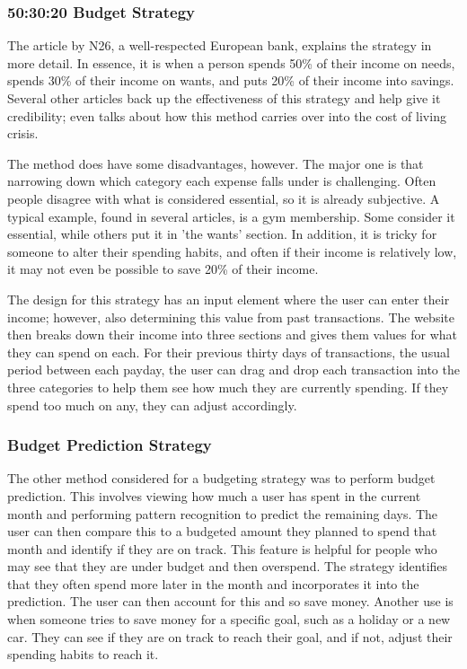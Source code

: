 \subsubsection{50:30:20 Budget Strategy}

The article \cite{503020Strategy} by N26, a well-respected European bank, explains the strategy in more detail. In essence, it is when a person spends 50\% of their income on needs, spends 30\% of their income on wants, and puts 20\% of their income into savings. Several other articles back up the effectiveness of this strategy and help give it credibility; \cite{503020InCostLivingCrisis} even talks about how this method carries over into the cost of living crisis. 

The method does have some disadvantages, however. The major one is that narrowing down which category each expense falls under is challenging. Often people disagree with what is considered essential, so it is already subjective. A typical example, found in several articles, is a gym membership. Some consider it essential, while others put it in 'the wants' section. In addition, it is tricky for someone to alter their spending habits, and often if their income is relatively low, it may not even be possible to save 20\% of their income.

The design for this strategy has an input element where the user can enter their income; however, also determining this value from past transactions. The website then breaks down their income into three sections and gives them values for what they can spend on each. For their previous thirty days of transactions, the usual period between each payday, the user can drag and drop each transaction into the three categories to help them see how much they are currently spending. If they spend too much on any, they can adjust accordingly.

\subsubsection{Budget Prediction Strategy}
The other method considered for a budgeting strategy was to perform budget prediction. This involves viewing how much a user has spent in the current month and performing pattern recognition to predict the remaining days. The user can then compare this to a budgeted amount they planned to spend that month and identify if they are on track. This feature is helpful for people who may see that they are under budget and then overspend. The strategy identifies that they often spend more later in the month and incorporates it into the prediction. The user can then account for this and so save money. Another use is when someone tries to save money for a specific goal, such as a holiday or a new car. They can see if they are on track to reach their goal, and if not, adjust their spending habits to reach it.


